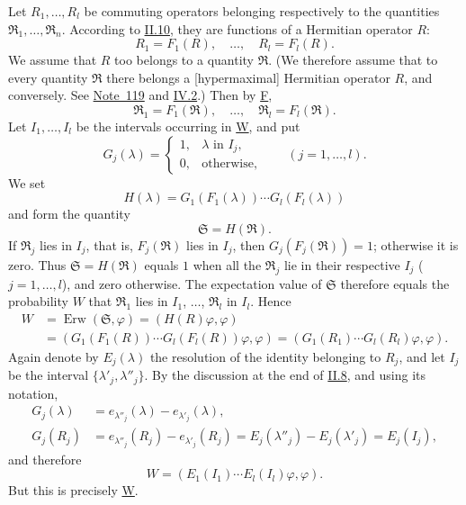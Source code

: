 \documentclass[fontsize=13pt,twoside,openany,headings=normal,parskip=false,bookmarkpackage=false,DIV=calc]{scrbook}
\begin{document}
Let $R_1,\ldots,R_l$ be commuting operators belonging respectively to the quantities $\mathfrak R_1,\ldots,\mathfrak R_n$. According to \hyperref[sec:II.10]{II.10}, they are functions of a Hermitian operator $R$:
\[
R_1=F_1(R),\quad\ldots,\quad R_l=F_l(R).
\]
We assume that $R$ too belongs to a quantity $\mathfrak R$. (We therefore assume that to every quantity $\mathfrak R$ there belongs a [hypermaximal] Hermitian operator $R$, and conversely. See \hyperlink{note-119}{Note~119} and \hyperref[sec:IV.2]{IV.2}.) Then by \hyperref[post:III.1.F]{F},
\[
\mathfrak R_1=F_1(\mathfrak R),\quad\ldots,\quad\mathfrak R_l=F_l(\mathfrak R).
\]
Let $I_1,\ldots,I_l$ be the intervals occurring in \hyperref[post:III.1.W]{W}, and put
\[
G_j(\lambda)=\begin{cases}1,&\lambda\text{ in }I_j,\\0,&\text{otherwise},\end{cases}
\qquad(j=1,\ldots,l).
\]
We set
\[
H(\lambda)=G_1(F_1(\lambda))\cdots G_l(F_l(\lambda))
\]
and form the quantity
\[
\mathfrak S=H(\mathfrak R).
\]
If $\mathfrak R_j$ lies in $I_j$, that is, $F_j(\mathfrak R)$ lies in $I_j$, then $G_j(F_j(\mathfrak R))=1$; otherwise it is zero. Thus $\mathfrak S=H(\mathfrak R)$ equals $1$ when all the $\mathfrak R_j$ lie in their respective $I_j$ ($j=1,\ldots,l$), and zero otherwise. The expectation value of $\mathfrak S$
\hypertarget{origpage-107}{}%
therefore equals the probability $W$ that $\mathfrak R_1$ lies in $I_1$, $\ldots$, $\mathfrak R_l$ in $I_l$. Hence
\begin{align*}
W&=\operatorname{Erw}(\mathfrak S,\varphi)=(H(R)\varphi,\varphi)\\
&=(G_1(F_1(R))\cdots G_l(F_l(R))\varphi,\varphi)
=(G_1(R_1)\cdots G_l(R_l)\varphi,\varphi).
\end{align*}
Again denote by $E_j(\lambda)$ the resolution of the identity belonging to $R_j$, and let $I_j$ be the interval $\{\lambda'_j,\lambda''_j\}$. By the discussion at the end of \hyperref[sec:II.8]{II.8}, and using its notation,
\begin{align*}
G_j(\lambda)&=e_{\lambda''_j}(\lambda)-e_{\lambda'_j}(\lambda),\\
G_j(R_j)&=e_{\lambda''_j}(R_j)-e_{\lambda'_j}(R_j)
=E_j(\lambda''_j)-E_j(\lambda'_j)=E_j(I_j),
\end{align*}
and therefore
\[
W=(E_1(I_1)\cdots E_l(I_l)\varphi,\varphi).
\]
But this is precisely \hyperref[post:III.1.W]{W}.
\end{document}
